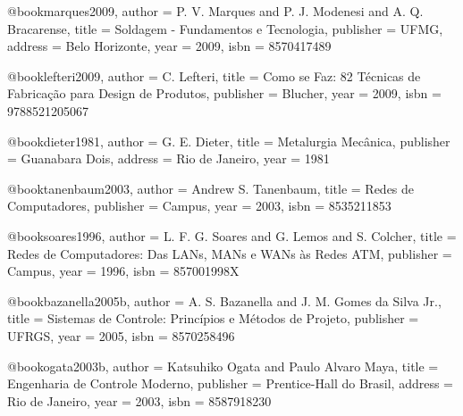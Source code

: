 @book{marques2009,
  author = {P. V. Marques and P. J. Modenesi and A. Q. Bracarense},
  title = {Soldagem - Fundamentos e Tecnologia},
  publisher = {UFMG},
  address = {Belo Horizonte},
  year = {2009},
  isbn = {8570417489}
}

@book{lefteri2009,
  author = {C. Lefteri},
  title = {Como se Faz: 82 Técnicas de Fabricação para Design de Produtos},
  publisher = {Blucher},
  year = {2009},
  isbn = {9788521205067}
}

@book{dieter1981,
  author = {G. E. Dieter},
  title = {Metalurgia Mecânica},
  publisher = {Guanabara Dois},
  address = {Rio de Janeiro},
  year = {1981}
}

%

@book{tanenbaum2003,
  author = {Andrew S. Tanenbaum},
  title = {Redes de Computadores},
  publisher = {Campus},
  year = {2003},
  isbn = {8535211853}
}

@book{soares1996,
  author = {L. F. G. Soares and G. Lemos and S. Colcher},
  title = {Redes de Computadores: Das LANs, MANs e WANs às Redes ATM},
  publisher = {Campus},
  year = {1996},
  isbn = {857001998X}
}

%

@book{bazanella2005b,
  author = {A. S. Bazanella and J. M. Gomes da Silva Jr.},
  title = {Sistemas de Controle: Princípios e Métodos de Projeto},
  publisher = {UFRGS},
  year = {2005},
  isbn = {8570258496}
}

@book{ogata2003b,
  author = {Katsuhiko Ogata and Paulo Alvaro Maya},
  title = {Engenharia de Controle Moderno},
  publisher = {Prentice-Hall do Brasil},
  address = {Rio de Janeiro},
  year = {2003},
  isbn = {8587918230}
}

